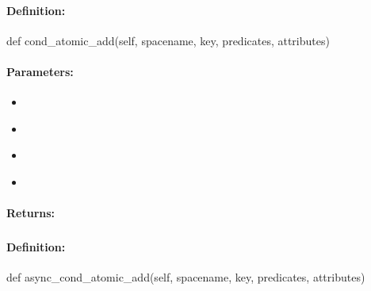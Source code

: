 \paragraph{Definition:}
\begin{pythoncode}
def cond_atomic_add(self, spacename, key, predicates, attributes)
\end{pythoncode}

\paragraph{Parameters:}
\begin{itemize}[noitemsep]
\item {}\\

\item {}\\

\item {}\\

\item {}\\

\end{itemize}

\paragraph{Returns:}


\pagebreak
\subsubsection{}
\label{api:python:async_cond_atomic_add}


\paragraph{Definition:}
\begin{pythoncode}
def async_cond_atomic_add(self, spacename, key, predicates, attributes)
\end{pythoncode}

